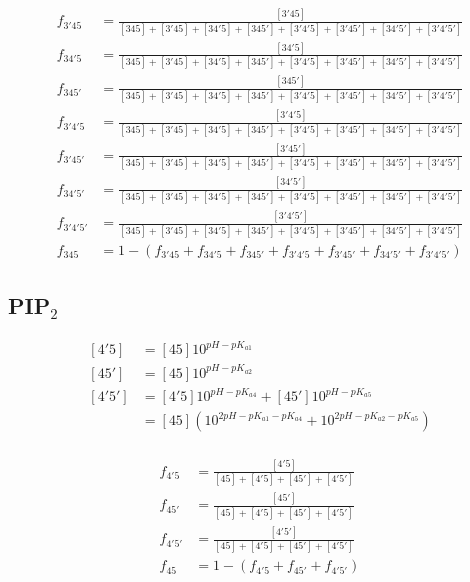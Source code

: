 \documentclass[12pt]{article}
\begin{document}
\begin{equation} \label{eq2}
\begin{split}
f_{3'45} & = \frac{[3'45]}{[345]+[3'45]+[34'5]+[345']+[3'4'5]+[3'45']+[34'5']+[3'4'5']} \\
f_{34'5} & = \frac{[34'5]}{[345]+[3'45]+[34'5]+[345']+[3'4'5]+[3'45']+[34'5']+[3'4'5']} \\
f_{345'} & = \frac{[345']}{[345]+[3'45]+[34'5]+[345']+[3'4'5]+[3'45']+[34'5']+[3'4'5']} \\
f_{3'4'5} & = \frac{[3'4'5]}{[345]+[3'45]+[34'5]+[345']+[3'4'5]+[3'45']+[34'5']+[3'4'5']} \\
f_{3'45'} & = \frac{[3'45']}{[345]+[3'45]+[34'5]+[345']+[3'4'5]+[3'45']+[34'5']+[3'4'5']} \\
f_{34'5'} & = \frac{[34'5']}{[345]+[3'45]+[34'5]+[345']+[3'4'5]+[3'45']+[34'5']+[3'4'5']} \\
f_{3'4'5'} &  = \frac{[3'4'5']}{[345]+[3'45]+[34'5]+[345']+[3'4'5]+[3'45']+[34'5']+[3'4'5']} \\
f_{345} & = 1-(f_{3'45}+f_{34'5}+f_{345'}+f_{3'4'5}+f_{3'45'}+f_{34'5'}+f_{3'4'5'})
\end{split}
\end{equation}

\subsection*{PIP$_2$}

\begin{equation} \label{eq3}
\begin{split}
[4'5] & = [45] 10^{pH-pK_{a1}}  \\
[45'] & = [45] 10^{pH-pK_{a2}} \\
[4'5'] & = [4'5] 10^{pH-pK_{a4}} + [45'] 10^{pH-pK_{a5}} \\
& = [45] (10^{2pH-pK_{a1}-pK_{a4}}  + 10^{2pH-pK_{a2}-pK_{a5}}) \\
\end{split}
\end{equation}


\begin{equation} \label{eq4}
\begin{split}
f_{4'5} & = \frac{[4'5]}{[45]+[4'5]+[45']+[4'5']} \\
f_{45'} & = \frac{[45']}{[45]+[4'5]+[45']+[4'5']} \\
f_{4'5'} &  = \frac{[4'5']}{[45]+[4'5]+[45']+[4'5']} \\
f_{45} & = 1-(f_{4'5}+f_{45'}+f_{4'5'})
\end{split}
\end{equation}
\end{document}
